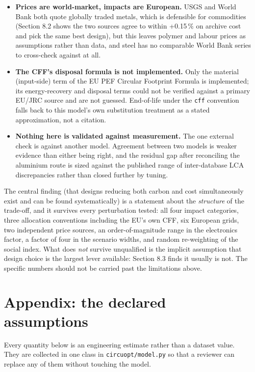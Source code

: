 \documentclass[11pt,a4paper]{article}
\begin{document}
\begin{itemize}
for inventory uncertainty, not a propagation of it. A study with access to
ecoinvent's uncertainty information could do this properly.
\item \textbf{Prices are world-market, impacts are European.} USGS and World
Bank both quote globally traded metals, which is defensible for commodities
(Section 8.2 shows the two sources agree to within +0.15\,\% on
archive cost and pick the same best design), but this leaves polymer and
labour prices as assumptions rather than data, and steel has no comparable
World Bank series to cross-check against at all.
\item \textbf{The CFF's disposal formula is not implemented.} Only the
material (input-side) term of the EU PEF Circular Footprint Formula is
implemented; its energy-recovery and disposal terms could not be verified
against a primary EU/JRC source and are not guessed. End-of-life under the
\texttt{cff} convention falls back to this model's own substitution
treatment as a stated approximation, not a citation.
\item \textbf{Nothing here is validated against measurement.} The one
external check is against another model. Agreement between two models is
weaker evidence than either being right, and the residual gap after
reconciling the aluminium route is sized against the published range of
inter-database LCA discrepancies rather than closed further by tuning.
\end{itemize}

The central finding (that designs reducing both carbon and cost simultaneously
exist and can be found systematically) is a statement about the
\emph{structure} of the
trade-off, and it survives every perturbation tested: all four impact
categories, three allocation conventions including the EU's own CFF, six
European grids, two independent price sources, an order-of-magnitude range in
the electronics factor, a factor of four in the scenario widths, and random
re-weighting of the social index. What does \emph{not} survive unqualified is
the implicit assumption that design choice is the largest lever available:
Section 8.3 finds it usually is not. The specific numbers should not be
carried past the limitations above.

\section{Appendix: the declared assumptions}

Every quantity below is an engineering estimate rather than a dataset value.
They are collected in one class in \texttt{circuopt/model.py} so that a
reviewer can replace any of them without touching the model.
\end{document}
